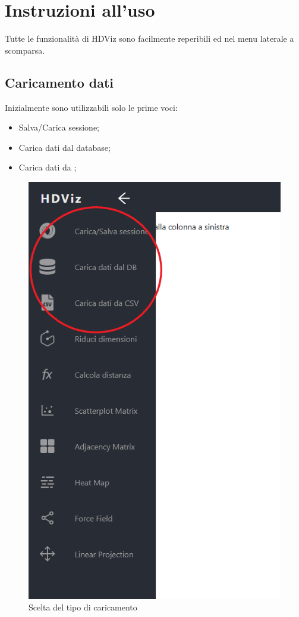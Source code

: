 \section{Instruzioni all'uso}
Tutte le funzionalità di HDViz sono facilmente reperibili ed nel menu laterale a scomparsa.

\subsection{Caricamento dati}
Inizialmente sono utilizzabili solo le prime voci:
\begin{itemize}
	\item Salva/Carica sessione;
	\item Carica dati dal database;
	\item Carica dati da ;
\end{itemize}
\begin{figure}[H]
		\includegraphics[scale=0.4]{Images/SceltaCaricamento.png}
		\centering
		\caption{Scelta del tipo di caricamento}
\end{figure}


